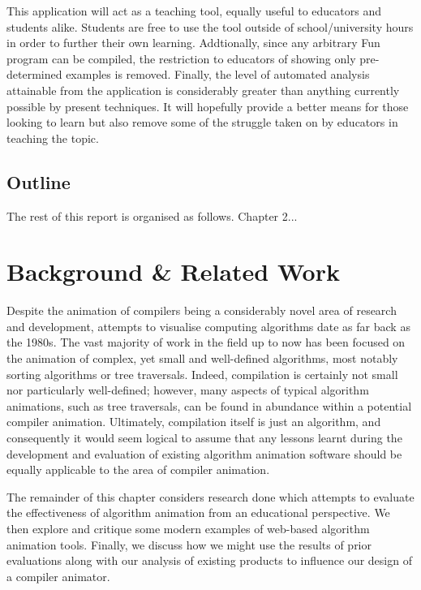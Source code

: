 \documentclass{l4proj}
\begin{document}
This application will act as a teaching tool, equally useful to educators and students alike. Students are free to use the tool outside of school/university hours in order to further their own learning. Addtionally, since any arbitrary Fun program can be compiled, the restriction to educators of showing only pre-determined examples is removed. Finally, the level of automated analysis attainable from the application is considerably greater than anything currently possible by present techniques. It will hopefully provide a better means for those looking to learn but also remove some of the struggle taken on by educators in teaching the topic.

\section{Outline}
The rest of this report is organised as follows. Chapter 2...

\chapter{Background \& Related Work}
Despite the animation of compilers being a considerably novel area of research and development, attempts to visualise computing algorithms date as far back as the 1980s\cite{BentleyKernighan}. The vast majority of work in the field up to now has been focused on the animation of complex, yet small and well-defined algorithms, most notably sorting algorithms or tree traversals. Indeed, compilation is certainly not small nor particularly well-defined; however, many aspects of typical algorithm animations, such as tree traversals, can be found in abundance within a potential compiler animation. Ultimately, compilation itself is just an algorithm,  and consequently it would seem logical to assume that any lessons learnt during the development and evaluation of existing algorithm animation software should be equally applicable to the area of compiler animation. 

The remainder of this chapter considers research done which attempts to evaluate the effectiveness of algorithm animation from an educational perspective. We then explore and critique some modern examples of web-based algorithm animation tools. Finally, we discuss how we might use the results of prior evaluations along with our analysis of existing products to influence our design of a compiler animator.
\end{document}
